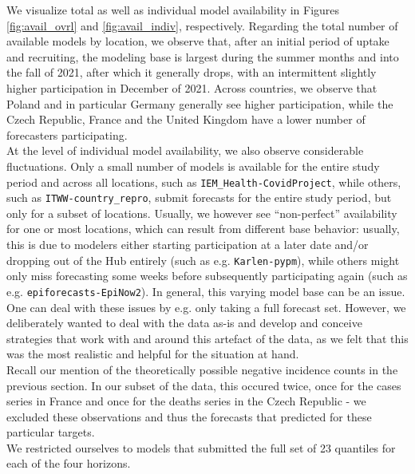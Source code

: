 We visualize total as well as individual model availability in Figures \ref{fig:avail_ovrl} and \ref{fig:avail_indiv}, respectively. Regarding the total number of available models by location, we observe that, after an initial period of uptake and recruiting, the modeling base is largest during the summer months and into the fall of 2021, after which it generally drops, with an intermittent slightly higher participation in December of 2021. Across countries, we observe that Poland and in particular Germany generally see higher participation, while the Czech Republic, France and the United Kingdom have a lower number of forecasters participating.\\
At the level of individual model availability, we also observe considerable fluctuations. Only a small number of models is available for the entire study period and across all locations, such as \texttt{IEM\_Health-CovidProject}, while others, such as \texttt{ITWW-country\_repro}, submit forecasts for the entire study period, but only for a subset of locations. Usually, we however see ``non-perfect'' availability for one or most locations, which can result from different base behavior: usually, this is due to modelers either starting participation at a later date and/or dropping out of the Hub entirely (such as e.g. \texttt{Karlen-pypm}), while others might only miss forecasting some weeks before subsequently participating again (such as e.g. \texttt{epiforecasts-EpiNow2}).
In general, this varying model base can be an issue. One can deal with these issues by e.g. only taking a full forecast set. However, we deliberately wanted to deal with the data as-is and develop and conceive strategies that work with and around this artefact of the data, as we felt that this was the most realistic and helpful for the situation at hand. \\
Recall our mention of the theoretically possible negative incidence counts in the previous section. In our subset of the data, this occured twice, once for the cases series in France and once for the deaths series in the Czech Republic - we excluded these observations and thus the forecasts that predicted for these particular targets.\\
We restricted ourselves to models that submitted the full set of 23 quantiles for each of the four horizons.\\
